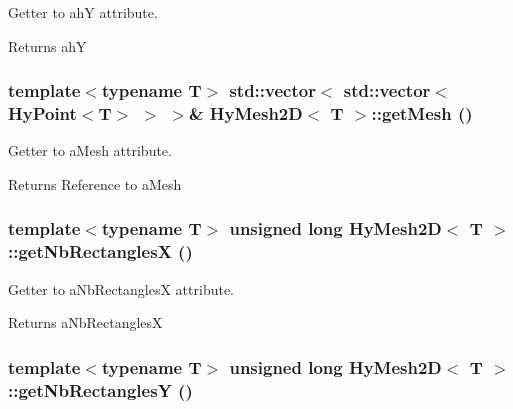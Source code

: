 Getter to ahY attribute. 

\begin{DoxyReturn}{Returns}
ahY 
\end{DoxyReturn}
\hypertarget{classHyMesh2D_a8f075d7ba59bc759dc138109fd551496}{
\subsubsection[{getMesh}]{\setlength{\rightskip}{0pt plus 5cm}template$<$typename T$>$ std::vector$<$ std::vector$<$ {\bf HyPoint}$<$T$>$ $>$ $>$\& {\bf HyMesh2D}$<$ T $>$::getMesh ()}}
\label{classHyMesh2D_a8f075d7ba59bc759dc138109fd551496}


Getter to aMesh attribute. 

\begin{DoxyReturn}{Returns}
Reference to aMesh 
\end{DoxyReturn}
\hypertarget{classHyMesh2D_a8646d6b9e0b42270744a2b3c15af2563}{
\subsubsection[{getNbRectanglesX}]{\setlength{\rightskip}{0pt plus 5cm}template$<$typename T$>$ unsigned long {\bf HyMesh2D}$<$ T $>$::getNbRectanglesX ()}}
\label{classHyMesh2D_a8646d6b9e0b42270744a2b3c15af2563}


Getter to aNbRectanglesX attribute. 

\begin{DoxyReturn}{Returns}
aNbRectanglesX 
\end{DoxyReturn}
\hypertarget{classHyMesh2D_af247c2440a04397980270bb0b4410225}{
\subsubsection[{getNbRectanglesY}]{\setlength{\rightskip}{0pt plus 5cm}template$<$typename T$>$ unsigned long {\bf HyMesh2D}$<$ T $>$::getNbRectanglesY ()}}
\label{classHyMesh2D_af247c2440a04397980270bb0b4410225}


